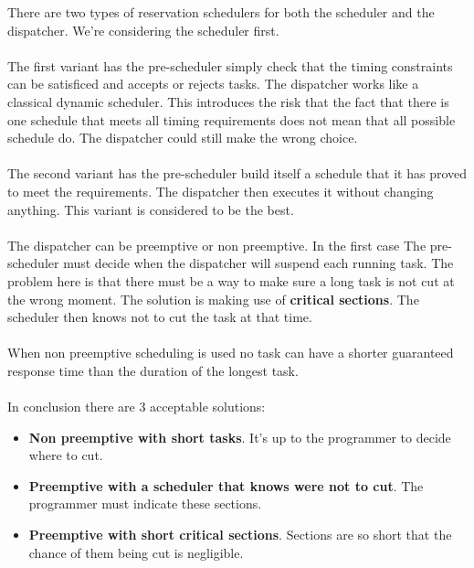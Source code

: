 There are two types of reservation schedulers for both the scheduler and the dispatcher. We're considering the scheduler first.\\\\
The first variant has the pre-scheduler simply check that the timing constraints can be satisficed and accepts or rejects tasks. The dispatcher works like a classical dynamic scheduler. This introduces the risk that the fact that there is one schedule that meets all timing requirements does not mean that all possible schedule do. The dispatcher could still make the wrong choice.
\\\\
The second variant has the pre-scheduler build itself a schedule that it has proved to meet the requirements. The dispatcher then executes it without changing anything. This variant is considered to be the best.
\\\\
The dispatcher can be preemptive or non preemptive. In the first case The pre-scheduler must decide when the dispatcher will suspend each running task. The problem here is that there must be a way to make sure a long task is not cut at the wrong moment. The solution is making use of \textbf{critical sections}. The scheduler then knows not to cut the task at that time. 
\\\\
When non preemptive scheduling is used no task can have a shorter guaranteed response time than the duration of the longest task.
\\\\
In conclusion there are 3 acceptable solutions:
\begin{itemize}
	\item \textbf{Non preemptive with short tasks}. It's up to the programmer to decide where to cut.
	\item \textbf{Preemptive with a scheduler that knows were not to cut}. The programmer must indicate these sections.
	\item \textbf{Preemptive with short critical sections}. Sections are so short that the chance of them being cut is negligible. 
\end{itemize}

